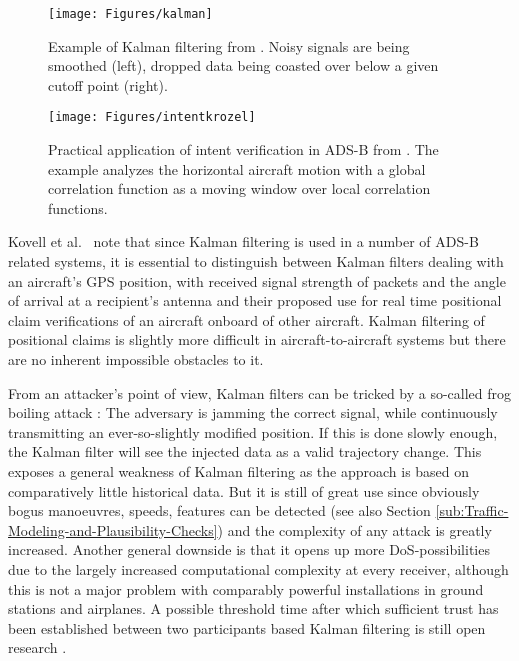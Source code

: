 \documentclass[english]{IEEEtran}
\begin{document}
\begin{figure}
\texttt{[image: Figures/kalman]}

\caption{Example of Kalman filtering from \cite{Krozel2004}. Noisy signals
are being smoothed (left), dropped data being coasted over below a
given cutoff point (right). \label{fig:Example-of-Kalman}}


\end{figure}


\begin{figure}
\begin{centering}
\texttt{[image: Figures/intentkrozel]}
\par\end{centering}

\caption{Practical application of intent verification in ADS-B from \cite{Krozel2004}.
The example analyzes the horizontal aircraft motion with a global
correlation function as a moving window over local correlation functions.}
\end{figure}


Kovell et al.~\cite{Kovell2012} note that since Kalman filtering
is used in a number of ADS-B related systems, it is essential to distinguish
between Kalman filters dealing with an aircraft's GPS position, with
received signal strength of packets and the angle of arrival at a
recipient's antenna and their proposed use for real time positional
claim verifications of an aircraft onboard of other aircraft. Kalman
filtering of positional claims is slightly more difficult in aircraft-to-aircraft
systems but there are no inherent impossible obstacles to it. 

From an attacker's point of view, Kalman filters can be tricked by
a so-called frog boiling attack \cite{Chan-tin2010}: The adversary
is jamming the correct signal, while continuously transmitting an
ever-so-slightly modified position. If this is done slowly enough,
the Kalman filter will see the injected data as a valid trajectory
change. This exposes a general weakness of Kalman filtering as the
approach is based on comparatively little historical data. But it
is still of great use since obviously bogus manoeuvres, speeds, features
can be detected (see also Section \ref{sub:Traffic-Modeling-and-Plausibility-Checks})
and the complexity of any attack is greatly increased. Another general
downside is that it opens up more DoS-possibilities due to the largely
increased computational complexity at every receiver, although this
is not a major problem with comparably powerful installations in ground
stations and airplanes. A possible threshold time after which sufficient
trust has been established between two participants based Kalman filtering
is still open research \cite{Kovell2012}. \\
\end{document}
